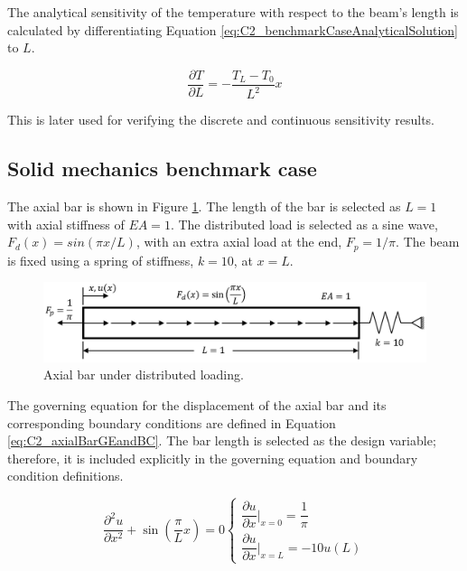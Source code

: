 The analytical sensitivity of the temperature with respect to the beam's length is calculated by differentiating Equation \eqref{eq:C2_benchmarkCaseAnalyticalSolution} to $L$.

\begin{equation}
    \frac{\partial T}{\partial L} = -\frac{T_L - T_0}{L^2} x
\end{equation}

This is later used for verifying the discrete and continuous sensitivity results.

\subsection{Solid mechanics benchmark case}\label{section:C2_solid_mechanics_benchmark}
The axial bar is shown in Figure \ref{fig:C2_axialBarPhysicalShape}. The length of the bar is selected as $L = 1$ with axial stiffness of $EA = 1$. The distributed load is selected as a sine wave, $F_d(x) = sin(\pi x/L)$, with an extra axial load at the end, $F_p = 1 / \pi$. The beam is fixed using a spring of stiffness, $k = 10$, at $x = L$.

\begin{figure}[h]
    \centering
    \includegraphics[width=14.00cm]{Chapter_2/figure/solid_mechanics_benchmark.png}
    \caption{Axial bar under distributed loading.}
    \label{fig:C2_axialBarPhysicalShape}
\end{figure}

The governing equation for the displacement of the axial bar and its corresponding boundary conditions are defined in Equation \eqref{eq:C2_axialBarGEandBC}. The bar length is selected as the design variable; therefore, it is included explicitly in the governing equation and boundary condition definitions.

\begin{subequations}
\begin{equation}\label{eq:C2_axialBarGE}
    \frac{\partial^2 u}{\partial x^2} + \sin \left( \frac{\pi}{L} x \right) = 0
\end{equation}
\begin{equation}\label{eq:C2_axialBarBC}
    \begin{cases}
    \dfrac{\partial u}{\partial x} \bigg|_{x = 0} = \dfrac{1}{\pi} \\
    \dfrac{\partial u}{\partial x} \bigg|_{x = L} = -10 u(L)
    \end{cases}
\end{equation}
\end{subequations}\label{eq:C2_axialBarGEandBC}


